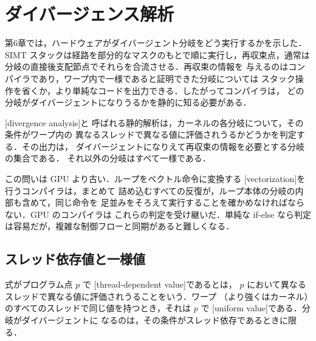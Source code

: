 \documentclass[../main.tex]{subfiles}
\begin{document}
\section{ダイバージェンス解析}
\label{sec:l11-divergence}

第6章では，ハードウェアがダイバージェント分岐をどう実行するかを示した．
SIMT スタックは経路を部分的なマスクのもとで順に実行し，再収束点，通常は
分岐の直接後支配節点でそれらを合流させる．再収束の情報を
与えるのはコンパイラであり，ワープ内で一様であると証明できた分岐については
スタック操作を省くか，より単純なコードを出力できる．したがってコンパイラは，
どの分岐がダイバージェントになりうるかを静的に知る必要がある．

\begin{definition}[ダイバージェンス解析]
  \label{def:l11-divergence-analysis}
  [divergence analysis]と
  呼ばれる静的解析は，カーネルの各分岐について，その条件がワープ内の
  異なるスレッドで異なる値に評価されうるかどうかを判定する．その出力は，
  ダイバージェントになりえて再収束の情報を必要とする分岐の集合である．
  それ以外の分岐はすべて一様である．
\end{definition}

この問いは GPU より古い．ループをベクトル命令に変換する
[vectorization]を行うコンパイラは，まとめて
詰め込むすべての反復が，ループ本体の分岐の内部も含めて，同じ命令を
足並みをそろえて実行することを確かめなければならない．GPU のコンパイラは
これらの判定を受け継いだ．単純な if-else
なら判定は容易だが，複雑な制御フローと同期があると難しくなる．

\subsection{スレッド依存値と一様値}

\begin{definition}[スレッド依存値と一様値]
  \label{def:l11-thread-dependent}
  式がプログラム点 $p$ で
  [thread-dependent value]であるとは，
  $p$ において異なるスレッドで異なる値に評価されうることをいう．ワープ
  （より強くはカーネル）のすべてのスレッドで同じ値を持つとき，それは $p$ で
  [uniform value]である．分岐がダイバージェントに
  なるのは，その条件がスレッド依存であるときに限る．
\end{definition}
\end{document}

